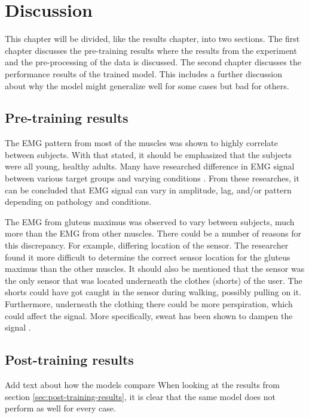 \documentclass[../main.tex]{subfiles}
\begin{document}
\chapter{Discussion}
\label{sec:discussion}
This chapter will be divided, like the results chapter, into two sections. 
The first chapter discusses the pre-training results where the results from the experiment and the pre-processing of the data is discussed.
The second chapter discusses the performance results of the trained model.
This includes a further discussion about why the model might generalize well for some cases but bad for others.

\section{Pre-training results}
\label{sec:discussion_pre-training-results}
The \ac{EMG} pattern from most of the muscles was shown to highly correlate between subjects.
With that stated, it should be emphasized that the subjects were all young, healthy adults.
Many have researched difference in \ac{EMG} signal between various target groups and varying conditions \cite{Courtine2003,Rezgui2013,Sacco2010}.
From these researches, it can be concluded that \ac{EMG} signal can vary in amplitude, lag, and/or pattern depending on pathology and conditions.

The \ac{EMG} from gluteus maximus was observed to vary between subjects, much more than the \ac{EMG} from other muscles.
There could be a number of reasons for this discrepancy.
For example, differing location of the sensor.
The researcher found it more difficult to determine the correct sensor location for the gluteus maximus than the other muscles.
It should also be mentioned that the sensor was the only sensor that was located underneath the clothes (shorts) of the user.
The shorts could have got caught in the sensor during walking, possibly pulling on it.
Furthermore, underneath the clothing there could be more perspiration, which could affect the signal.
More specifically, sweat has been shown to dampen the signal \cite{Abdoli-Eramaki2012}.


\section{Post-training results}
\label{sec:discussion_post-training-results}
Add text about how the models compare
When looking at the results from section \ref{sec:post-training-results}, it is clear that the same model does not perform as well for every case.
\end{document}
